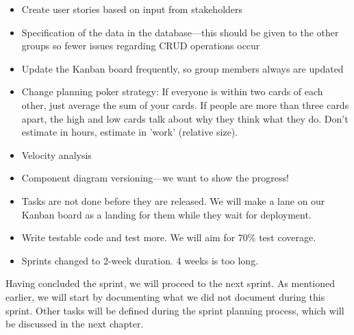 \begin{itemize}
    \item Create user stories based on input from stakeholders
    \item Specification of the data in the database---this should be given to the other groups so fewer issues regarding CRUD operations occur
    \item Update the Kanban board frequently, so group members always are updated
    \item Change planning poker strategy:
    \subitem If everyone is within two cards of each other, just average the sum of your cards.
    \subitem If people are more than three cards apart, the high and low cards talk about why they think what they do.
    \subitem Don't estimate in hours, estimate in 'work' (relative size).
    \item Velocity analysis
    \item Component diagram versioning---we want to show the progress!
    \item Tasks are not done before they are released. We will make a lane on our Kanban board as a landing for them while they wait for deployment.
    \item Write testable code and test more. We will aim for 70\% test coverage.
    \item Sprints changed to 2-week duration. 4 weeks is too long.
\end{itemize}

Having concluded the sprint, we will proceed to the next sprint. As mentioned earlier, we will start by documenting what we did not document during this sprint. 
Other tasks will be defined during the sprint planning process, which will be discussed in the next chapter.